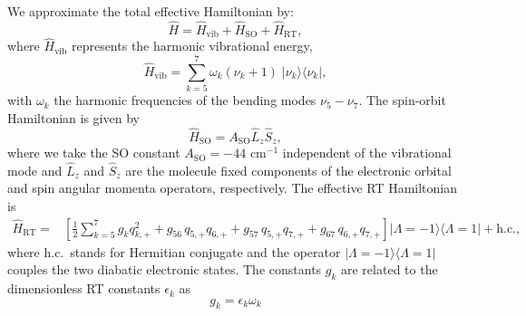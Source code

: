 We approximate the total effective Hamiltonian by: 
\begin{equation}
  \hat{H}=\hat{H}_\mathrm{vib} + \hat{H}_\mathrm{SO} + \hat{H}_\mathrm{RT}
    \label{eqn:Hamil},
\end{equation}
where $\hat{H}_\mathrm{vib}$ represents the harmonic vibrational energy,
\begin{equation}
  \hat{H}_\mathrm{vib} = \sum_{k=5}^7 \omega_k(\nu_k+1)\; |\nu_k\rangle \langle \nu_k|,    
\end{equation}
with $\omega_k$ the harmonic frequencies of the bending modes $\nu_5-\nu_7$. The spin-orbit Hamiltonian is given by \cite{Pople1960}
\begin{equation}
  \hat{H}_\mathrm{SO} = A_\mathrm{SO} \hat{L}_z \hat{S}_z,
\end{equation}
where we take the SO constant $A_\mathrm{SO}=-44$ cm$^{-1}$ independent of the vibrational mode \cite{Dai2015TheCalculations} and $\hat{L}_z$ and $\hat{S}_z$ are the molecule fixed components of the electronic orbital and spin angular momenta operators, respectively. The effective RT Hamiltonian is \cite{Brown1977TheEffect} 
\begin{align}
  \hat{H}_\mathrm{RT}=&  
   \left[ \frac{1}{2} \sum_{k=5}^7 g_k q_{k,+}^2
  + g_{56}\, q_{5,+}q_{6,+}
  + g_{57}\, q_{5,+}q_{7,+}
  + g_{67}\, q_{6,+}q_{7,+}
  \right] 
  |\Lambda=-1\rangle \langle \Lambda=1| + \mbox{h.c.},
\end{align}
where h.c.\ stands for Hermitian conjugate and the operator
$|\Lambda=-1\rangle \langle \Lambda=1|$ couples the two diabatic electronic
states. The constants $g_k$ are related to the dimensionless
RT constants $\epsilon_k$ as
\begin{equation}
    g_k = \epsilon_k \omega_k
\end{equation}
